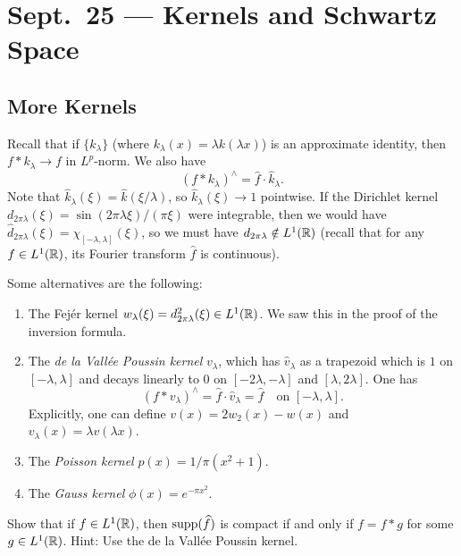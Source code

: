 \chapter{Sept.~25 --- Kernels and Schwartz Space}

\section{More Kernels}

\begin{remark}
  Recall that if $\{k_\lambda\}$ (where
  $k_\lambda(x) = \lambda k(\lambda x)$)
  is an
  approximate identity, then
  $f * k_\lambda \to f$ in $L^p$-norm.
  We also have
  \[
    (f * k_\lambda)^\wedge
    = \widehat{f} \cdot \widehat{k}_\lambda.
  \]
  Note that $\widehat{k}_\lambda(\xi) = \widehat{k}(\xi/\lambda)$,
  so $\widehat{k}_\lambda(\xi) \to 1$
  pointwise.
  If the Dirichlet kernel $d_{2\pi \lambda}(\xi) = \sin(2\pi \lambda \xi) / (\pi \xi)$
  were integrable, then we would have
  $\widehat{d}_{2\pi \lambda}(\xi) = \chi_{[-\lambda, \lambda]}(\xi)$,
  so we must have
  $d_{2\pi \lambda} \notin L^1(\mathbb{R})$ (recall
  that for any $f \in L^1(\mathbb{R})$, its
  Fourier transform $\widehat{f}$ is continuous).

  Some alternatives are the following:
  \begin{enumerate}
    \item 
      The
      Fej\'er kernel $w_\lambda(\xi) = d^2_{2\pi \lambda}(\xi) \in L^1(\mathbb{R})$.
      We saw this in the proof of the
      inversion formula.
    \item The \emph{de la Vall\'ee Poussin kernel}
      $v_{\lambda}$, which has
      $\widehat{v}_\lambda$ as a trapezoid
      which is $1$ on $[-\lambda, \lambda]$
      and decays linearly to $0$
      on $[-2\lambda, -\lambda]$ and $[\lambda, 2\lambda]$.
      One has
      \[
        (f * v_\lambda)^\wedge
        = \widehat{f} \cdot \widehat{v}_\lambda
        = \widehat{f}
        \quad \text{on } [-\lambda, \lambda].
      \]
      Explicitly, one can define
      $v(x) = 2w_2(x) - w(x)$ and
      $v_\lambda(x) = \lambda v(\lambda x)$.
    \item The \emph{Poisson kernel}
      $p(x) = 1 / \pi(x^2 + 1)$.
    \item The \emph{Gauss kernel}
      $\phi(x) = e^{-\pi x^2}$.
  \end{enumerate}
\end{remark}

\begin{exercise}
  Show that if
  $f \in L^1(\mathbb{R})$, then
  $\operatorname{supp}(\widehat{f})$ is compact
  if and only if $f = f * g$ for some
  $g \in L^1(\mathbb{R})$.
  Hint: Use the de la Vall\'ee Poussin kernel.
\end{exercise}

